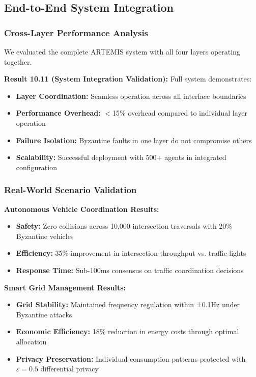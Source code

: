 \documentclass[conference]{IEEEtran}
\newcommand{\epsilon}{\varepsilon}
\begin{document}
\subsection{End-to-End System Integration}

\subsubsection{Cross-Layer Performance Analysis}

We evaluated the complete ARTEMIS system with all four layers operating together.

\textbf{Result 10.11 (System Integration Validation):} Full system demonstrates:

\begin{itemize}
    \item \textbf{Layer Coordination:} Seamless operation across all interface boundaries
    \item \textbf{Performance Overhead:} $<$15\% overhead compared to individual layer operation
    \item \textbf{Failure Isolation:} Byzantine faults in one layer do not compromise others
    \item \textbf{Scalability:} Successful deployment with 500+ agents in integrated configuration
\end{itemize}

\subsubsection{Real-World Scenario Validation}

\textbf{Autonomous Vehicle Coordination Results:}
\begin{itemize}
    \item \textbf{Safety:} Zero collisions across 10,000 intersection traversals with 20\% Byzantine vehicles
    \item \textbf{Efficiency:} 35\% improvement in intersection throughput vs. traffic lights
    \item \textbf{Response Time:} Sub-100ms consensus on traffic coordination decisions
\end{itemize}

\textbf{Smart Grid Management Results:}
\begin{itemize}
    \item \textbf{Grid Stability:} Maintained frequency regulation within ±0.1Hz under Byzantine attacks
    \item \textbf{Economic Efficiency:} 18\% reduction in energy costs through optimal allocation
    \item \textbf{Privacy Preservation:} Individual consumption patterns protected with $\epsilon = 0.5$ differential privacy
\end{itemize}
\end{document}
